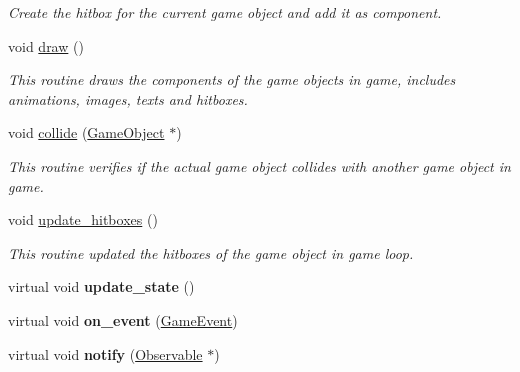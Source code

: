 \begin{DoxyCompactItemize}
\begin{DoxyCompactList}\small\item\em Create the hitbox for the current game object and add it as component. \end{DoxyCompactList}\item 
void \hyperlink{classengine_1_1_game_object_abb64143e72358beb808db22182517802}{draw} ()
\begin{DoxyCompactList}\small\item\em This routine draws the components of the game objects in game, includes animations, images, texts and hitboxes. \end{DoxyCompactList}\item 
void \hyperlink{classengine_1_1_game_object_a869a76802055d23b7604e48b584177f1}{collide} (\hyperlink{classengine_1_1_game_object}{Game\+Object} $\ast$)
\begin{DoxyCompactList}\small\item\em This routine verifies if the actual game object collides with another game object in game. \end{DoxyCompactList}\item 
void \hyperlink{classengine_1_1_game_object_a2980a8e0a6828ddc05756fdb9f4d78b7}{update\+\_\+hitboxes} ()
\begin{DoxyCompactList}\small\item\em This routine updated the hitboxes of the game object in game loop. \end{DoxyCompactList}\item 
virtual void {\bfseries update\+\_\+state} ()\hypertarget{classengine_1_1_game_object_a3ff8e4baff0f6e2713bf57b85ba1050a}{}\label{classengine_1_1_game_object_a3ff8e4baff0f6e2713bf57b85ba1050a}

\item 
virtual void {\bfseries on\+\_\+event} (\hyperlink{class_game_event}{Game\+Event})\hypertarget{classengine_1_1_game_object_a01a503c00127facdd2416b93475cb275}{}\label{classengine_1_1_game_object_a01a503c00127facdd2416b93475cb275}

\item 
virtual void {\bfseries notify} (\hyperlink{classengine_1_1_observable}{Observable} $\ast$)\hypertarget{classengine_1_1_game_object_aa1ccfdc0753b18902be80c2866c543a0}{}\label{classengine_1_1_game_object_aa1ccfdc0753b18902be80c2866c543a0}


\end{DoxyCompactItemize}
